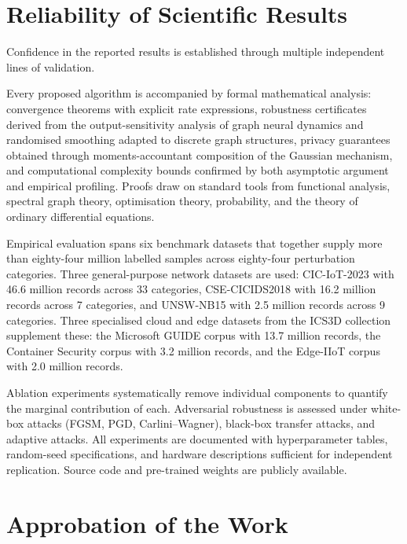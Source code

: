 \section*{Reliability of Scientific Results}

Confidence in the reported results is established through multiple independent lines of validation.

Every proposed algorithm is accompanied by formal mathematical analysis: convergence theorems with explicit rate expressions, robustness certificates derived from the output-sensitivity analysis of graph neural dynamics and randomised smoothing adapted to discrete graph structures, privacy guarantees obtained through moments-accountant composition of the Gaussian mechanism, and computational complexity bounds confirmed by both asymptotic argument and empirical profiling. Proofs draw on standard tools from functional analysis, spectral graph theory, optimisation theory, probability, and the theory of ordinary differential equations.

Empirical evaluation spans six benchmark datasets that together supply more than eighty-four million labelled samples across eighty-four perturbation categories. Three general-purpose network datasets are used: CIC-IoT-2023 with 46.6 million records across 33 categories, CSE-CICIDS2018 with 16.2 million records across 7 categories, and UNSW-NB15 with 2.5 million records across 9 categories. Three specialised cloud and edge datasets from the ICS3D collection supplement these: the Microsoft GUIDE corpus with 13.7 million records, the Container Security corpus with 3.2 million records, and the Edge-IIoT corpus with 2.0 million records.

Ablation experiments systematically remove individual components to quantify the marginal contribution of each. Adversarial robustness is assessed under white-box attacks (FGSM, PGD, Carlini--Wagner), black-box transfer attacks, and adaptive attacks. All experiments are documented with hyperparameter tables, random-seed specifications, and hardware descriptions sufficient for independent replication. Source code and pre-trained weights are publicly available.


\section*{Approbation of the Work}

